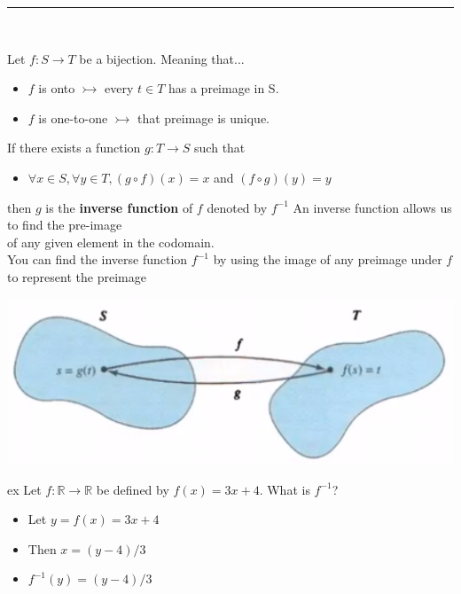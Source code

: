 \documentclass[12pt, letterpaper]{article}
\newcommand{\exheader}[1][ex]{{\tiny{#1}\normalsize}}
\newcommand{\horizline}[0]{\noindent\rule{\textwidth}{1pt}\\}
\begin{document}
\horizline

\begin{minipage}[position]{0.75\linewidth}
	Let $f: S \rightarrow T$ be a bijection. Meaning that...
	\begin{itemize}[leftmargin=*, label={}]
		\item $f$ is onto $\rightarrowtail$ every $t \in T$ has a preimage in S.
		\item $f$ is one-to-one $\rightarrowtail$ that preimage is unique.
	\end{itemize}
	If there exists a function $g: T \rightarrow S$ such that
	\begin{itemize}[leftmargin=*, label={}]
		\item $\forall x \in S, \forall y \in T, (g \circ f)(x) = x$ and $(f \circ g)(y) = y$
	\end{itemize}
	then $g$ is the \textbf{inverse function} of $f$ denoted by $f^{-1}$
	\smallbreak
	An inverse function allows us to find the pre-image \\ of any given element in the codomain. \\
	You can find the inverse function $f^{-1}$ by using the image of any preimage under $f$ to represent the preimage
\end{minipage}
\begin{minipage}[t]{0.35\linewidth}
    \centering
    \strut\vspace*{-4\baselineskip}\newline\hspace*{-4.5cm}\includegraphics[width=\linewidth]{inversefuncs.png} \smallbreak
\end{minipage}
\bigbreak
\exheader[ex] Let $f: \mathbb{R} \rightarrow \mathbb{R}$ be defined by $f(x) = 3x + 4$. What is $f^{-1}$?
\begin{itemize}[leftmargin=*, label={}]
	\item Let $y = f(x) = 3x + 4$
	\item Then $x = (y-4) / 3$
	\item $f^{-1}(y) = (y-4)/3$
\end{itemize}
\end{document}
